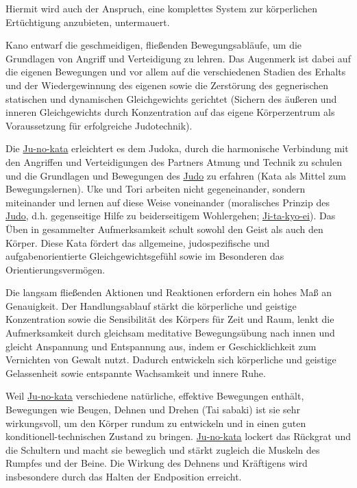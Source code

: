 \documentclass[justified, a4paper, notitlepage, captions=tableheading, nobib]{tufte-handout}
\begin{document}
Hiermit wird auch der Anspruch, eine komplettes System zur körperlichen Ertüchtigung anzubieten, untermauert.

Kano entwarf die geschmeidigen, fließenden Bewegungsabläufe, um die Grundlagen von Angriff und Verteidigung zu lehren. Das Augenmerk ist dabei auf die eigenen Bewegungen und vor allem auf die verschiedenen Stadien des Erhalts und der Wiedergewinnung des eigenen sowie die Zerstörung des gegnerischen statischen und dynamischen Gleichgewichts gerichtet (Sichern des äußeren und inneren Gleichgewichts durch Konzentration auf das eigene Körperzentrum als Voraussetzung für erfolgreiche Judotechnik).

Die \hyperref[org4191c24]{Ju-no-kata} erleichtert es dem Judoka, durch die harmonische Verbindung mit den Angriffen und Verteidigungen des Partners Atmung und Technik zu schulen und die Grundlagen und Bewegungen des \hyperref[org39a3ee2]{Judo} zu erfahren (Kata als Mittel zum Bewegungslernen). Uke und Tori arbeiten nicht gegeneinander, sondern miteinander und lernen auf diese Weise voneinander (moralisches Prinzip des \hyperref[org39a3ee2]{Judo}, d.h. gegenseitige Hilfe zu beiderseitigem Wohlergehen; \hyperref[orgc231618]{Ji-ta-kyo-ei}). Das Üben in gesammelter Aufmerksamkeit schult sowohl den Geist als auch den Körper. Diese Kata fördert das allgemeine, judospezifische und aufgabenorientierte Gleichgewichtsgefühl sowie im Besonderen das Orientierungsvermögen.

Die langsam fließenden Aktionen und Reaktionen erfordern ein hohes Maß an Genauigkeit. Der Handlungsablauf stärkt die körperliche und geistige Konzentration sowie die Sensibilität des Körpers für Zeit und Raum, lenkt die Aufmerksamkeit durch gleichsam meditative Bewegungsübung nach innen und gleicht Anspannung und Entspannung aus, indem er Geschicklichkeit zum Vernichten von Gewalt nutzt.
Dadurch entwickeln sich körperliche und geistige Gelassenheit sowie entspannte Wachsamkeit und innere Ruhe.

Weil \hyperref[org4191c24]{Ju-no-kata} verschiedene natürliche, effektive Bewegungen enthält, Bewegungen wie Beugen, Dehnen und Drehen (Tai sabaki) ist sie sehr wirkungsvoll, um den Körper rundum zu entwickeln und in einen guten konditionell-technischen Zustand zu bringen. \hyperref[org4191c24]{Ju-no-kata} lockert das Rückgrat und die Schultern und macht sie beweglich und stärkt zugleich die Muskeln des Rumpfes und der Beine. Die Wirkung des Dehnens und Kräftigens wird insbesondere durch das Halten der Endposition erreicht.
\end{document}
